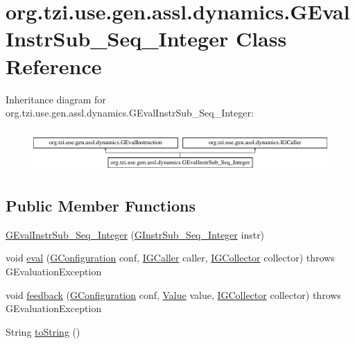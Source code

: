 \hypertarget{classorg_1_1tzi_1_1use_1_1gen_1_1assl_1_1dynamics_1_1_g_eval_instr_sub___seq___integer}{\section{org.\-tzi.\-use.\-gen.\-assl.\-dynamics.\-G\-Eval\-Instr\-Sub\-\_\-\-Seq\-\_\-\-Integer Class Reference}
\label{classorg_1_1tzi_1_1use_1_1gen_1_1assl_1_1dynamics_1_1_g_eval_instr_sub___seq___integer}
}
Inheritance diagram for org.\-tzi.\-use.\-gen.\-assl.\-dynamics.\-G\-Eval\-Instr\-Sub\-\_\-\-Seq\-\_\-\-Integer\-:\begin{figure}[H]
\begin{center}
\leavevmode
\includegraphics[height=1.623188cm]{classorg_1_1tzi_1_1use_1_1gen_1_1assl_1_1dynamics_1_1_g_eval_instr_sub___seq___integer}
\end{center}
\end{figure}
\subsection*{Public Member Functions}
\begin{DoxyCompactItemize}
\item 
\hyperlink{classorg_1_1tzi_1_1use_1_1gen_1_1assl_1_1dynamics_1_1_g_eval_instr_sub___seq___integer_a8aaf5127f7a8f363a135a8cff03f4082}{G\-Eval\-Instr\-Sub\-\_\-\-Seq\-\_\-\-Integer} (\hyperlink{classorg_1_1tzi_1_1use_1_1gen_1_1assl_1_1statics_1_1_g_instr_sub___seq___integer}{G\-Instr\-Sub\-\_\-\-Seq\-\_\-\-Integer} instr)
\item 
void \hyperlink{classorg_1_1tzi_1_1use_1_1gen_1_1assl_1_1dynamics_1_1_g_eval_instr_sub___seq___integer_a9943d40fef244f6488f9487696473e6a}{eval} (\hyperlink{classorg_1_1tzi_1_1use_1_1gen_1_1assl_1_1dynamics_1_1_g_configuration}{G\-Configuration} conf, \hyperlink{interfaceorg_1_1tzi_1_1use_1_1gen_1_1assl_1_1dynamics_1_1_i_g_caller}{I\-G\-Caller} caller, \hyperlink{interfaceorg_1_1tzi_1_1use_1_1gen_1_1assl_1_1dynamics_1_1_i_g_collector}{I\-G\-Collector} collector)  throws G\-Evaluation\-Exception 
\item 
void \hyperlink{classorg_1_1tzi_1_1use_1_1gen_1_1assl_1_1dynamics_1_1_g_eval_instr_sub___seq___integer_ac4ae5a682983570e15b96bcbfc90e706}{feedback} (\hyperlink{classorg_1_1tzi_1_1use_1_1gen_1_1assl_1_1dynamics_1_1_g_configuration}{G\-Configuration} conf, \hyperlink{classorg_1_1tzi_1_1use_1_1uml_1_1ocl_1_1value_1_1_value}{Value} value, \hyperlink{interfaceorg_1_1tzi_1_1use_1_1gen_1_1assl_1_1dynamics_1_1_i_g_collector}{I\-G\-Collector} collector)  throws G\-Evaluation\-Exception 
\item 
String \hyperlink{classorg_1_1tzi_1_1use_1_1gen_1_1assl_1_1dynamics_1_1_g_eval_instr_sub___seq___integer_abe90c364f7a89722c6a9828874b03518}{to\-String} ()
\end{DoxyCompactItemize}

